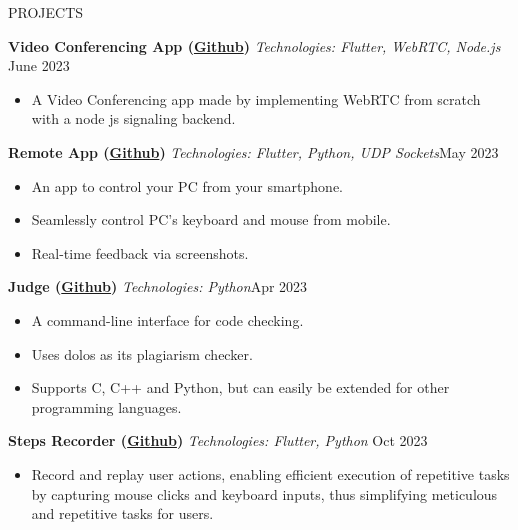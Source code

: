 \documentclass{resume} %
\begin{document}
\begin{rSection}{PROJECTS}

    \textbf{Video Conferencing App (\href{https://github.com/ShivanshuKGupta/flutter-webrtc-app}{Github})} \textit{Technologies: Flutter, WebRTC, Node.js} \hfill June 2023

    \begin{itemize}
        \itemsep -3pt {}
        \item A Video Conferencing app made by implementing WebRTC from scratch with a node js signaling backend.
    \end{itemize}

    \textbf{Remote App (\href{https://github.com/ShivanshuKGupta/remote}{Github})} \textit{Technologies: Flutter, Python, UDP Sockets}\hfill May 2023

    \begin{itemize}
        \itemsep -3pt {}
        \item An app to control your PC from your smartphone.
        \item Seamlessly control PC's keyboard and mouse from mobile.
        \item Real-time feedback via screenshots.

    \end{itemize}

    \textbf{Judge (\href{https://github.com/ShivanshuKGupta/Judge}{Github})} \textit{Technologies: Python}\hfill Apr 2023

    \begin{itemize}
        \itemsep -3pt {}
        \item A command-line interface for code checking.
        \item Uses dolos as its plagiarism checker.
        \item Supports C, C++ and Python, but can easily be extended for other programming languages.

    \end{itemize}

    \textbf{Steps Recorder (\href{https://github.com/ShivanshuKGupta/Steps-Recorder}{Github})} \textit{Technologies: Flutter, Python} \hfill Oct 2023
    \begin{itemize}
        \itemsep -3pt {}
        \item Record and replay user actions, enabling efficient execution of repetitive tasks by capturing mouse clicks and keyboard inputs, thus simplifying meticulous and repetitive tasks for users.
    \end{itemize}


\end{rSection}
\end{document}
